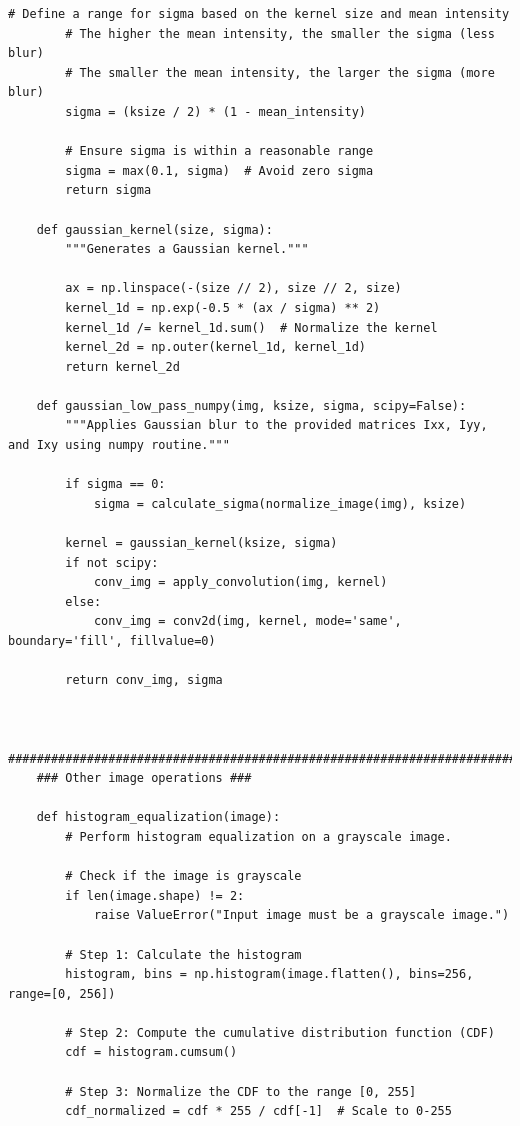 \documentclass[11pt, conference, letterpaper]{IEEEtran}
\begin{document}
\begin{lstlisting}[style=python, caption={\texttt{image\_utils.py}}, label={lst:iutils}]
        # Define a range for sigma based on the kernel size and mean intensity
        # The higher the mean intensity, the smaller the sigma (less blur)
        # The smaller the mean intensity, the larger the sigma (more blur)
        sigma = (ksize / 2) * (1 - mean_intensity)
    
        # Ensure sigma is within a reasonable range
        sigma = max(0.1, sigma)  # Avoid zero sigma
        return sigma
    
    def gaussian_kernel(size, sigma):
        """Generates a Gaussian kernel."""
                
        ax = np.linspace(-(size // 2), size // 2, size)
        kernel_1d = np.exp(-0.5 * (ax / sigma) ** 2)
        kernel_1d /= kernel_1d.sum()  # Normalize the kernel
        kernel_2d = np.outer(kernel_1d, kernel_1d)
        return kernel_2d
    
    def gaussian_low_pass_numpy(img, ksize, sigma, scipy=False):
        """Applies Gaussian blur to the provided matrices Ixx, Iyy, and Ixy using numpy routine."""
        
        if sigma == 0:
            sigma = calculate_sigma(normalize_image(img), ksize)
            
        kernel = gaussian_kernel(ksize, sigma)
        if not scipy:
            conv_img = apply_convolution(img, kernel)
        else:
            conv_img = conv2d(img, kernel, mode='same', boundary='fill', fillvalue=0)
        
        return conv_img, sigma
    
    
    ##########################################################################################
    ### Other image operations ###
    
    def histogram_equalization(image):
        # Perform histogram equalization on a grayscale image.
    
        # Check if the image is grayscale
        if len(image.shape) != 2:
            raise ValueError("Input image must be a grayscale image.")
    
        # Step 1: Calculate the histogram
        histogram, bins = np.histogram(image.flatten(), bins=256, range=[0, 256])
    
        # Step 2: Compute the cumulative distribution function (CDF)
        cdf = histogram.cumsum()
    
        # Step 3: Normalize the CDF to the range [0, 255]
        cdf_normalized = cdf * 255 / cdf[-1]  # Scale to 0-255
    

\end{lstlisting}
\end{document}

